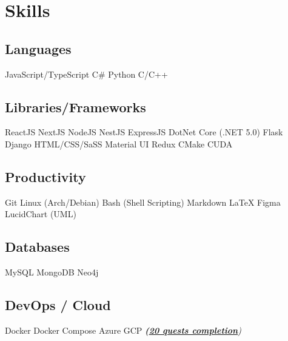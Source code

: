 \documentclass[]{openfont}
\begin{document}
\begin{minipage}[t]{0.33\textwidth}

\sectionsep


\section{Skills}

\subsection{Languages}
JavaScript/TypeScript \textbullet{} C\# \textbullet{} Python \textbullet{} C/C++
\sectionsep

\subsection{Libraries/Frameworks}
ReactJS \textbullet{} NextJS \textbullet{} NodeJS \textbullet{} NestJS \textbullet{} ExpressJS  \textbullet{} DotNet Core (.NET 5.0) \textbullet{} Flask \textbullet{} Django \textbullet{} HTML/CSS/SaSS \textbullet{} Material UI \textbullet{} Redux \textbullet{} CMake \textbullet{} CUDA
\sectionsep 

\subsection{Productivity}
Git \textbullet{} Linux (Arch/Debian) \textbullet{} Bash (Shell Scripting) \textbullet{} Markdown \textbullet{} LaTeX \textbullet{} Figma  \textbullet{} LucidChart (UML)
\sectionsep

\subsection{Databases}
MySQL \textbullet{} MongoDB \textbullet{} Neo4j
\sectionsep

\subsection{DevOps / Cloud}
Docker \textbullet{} Docker Compose \textbullet{} Azure \textbullet{} GCP {\footnotesize\textit{\textbf{(\href{https://www.qwiklabs.com/public_profiles/d0984371-b6fe-43de-ae48-a4cbad94d26f}{20 quests completion}})}}
\sectionsep

%
%

\end{minipage} 
\end{document}
